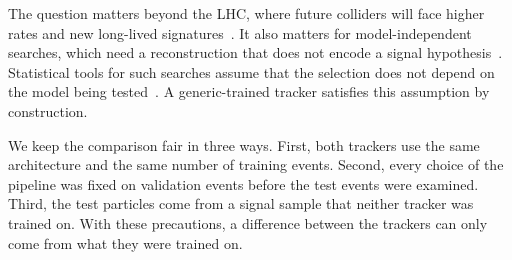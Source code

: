 The question matters beyond the LHC, where future colliders will face higher rates and new long-lived signatures~\cite{Chen2023FCC,Vargas2018Software}.
It also matters for model-independent searches, which need a reconstruction that does not encode a signal hypothesis~\cite{Moreau2010Anomaly}.
Statistical tools for such searches assume that the selection does not depend on the model being tested~\cite{Quinn2016Statistics}.
A generic-trained tracker satisfies this assumption by construction.

We keep the comparison fair in three ways.
First, both trackers use the same architecture and the same number of training events.
Second, every choice of the pipeline was fixed on validation events before the test events were examined.
Third, the test particles come from a signal sample that neither tracker was trained on.
With these precautions, a difference between the trackers can only come from what they were trained on.
